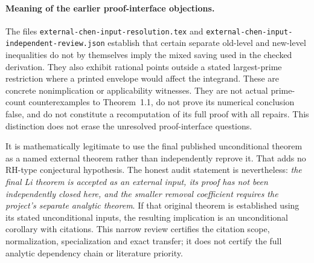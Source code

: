 \paragraph{Meaning of the earlier proof-interface objections.}
The files \texttt{external-chen-input-resolution.tex} and
\texttt{external-chen-input-independent-review.json} establish that
certain separate old-level and new-level inequalities do not by
themselves imply the mixed saving used in the checked derivation.
They also exhibit rational points outside a stated largest-prime
restriction where a printed envelope would affect the integrand.
These are concrete nonimplication or applicability witnesses. They are
not actual prime-count counterexamples to Theorem~1.1, do not prove its
numerical conclusion false, and do not constitute a recomputation of its
full proof with all repairs. This distinction does not erase the
unresolved proof-interface questions.

It is mathematically legitimate to use the final published unconditional
theorem as a named external theorem rather than independently reprove
it. That adds no RH-type conjectural hypothesis. The honest audit
statement is nevertheless: \emph{the final Li theorem is accepted as an
external input, its proof has not been independently closed here, and
the smaller removal coefficient requires the project's separate
analytic theorem}. If that original theorem is established using its
stated unconditional inputs, the resulting implication is an
unconditional corollary with citations. This narrow review certifies
the citation scope, normalization, specialization and exact transfer;
it does not certify the full analytic dependency chain or literature
priority.

